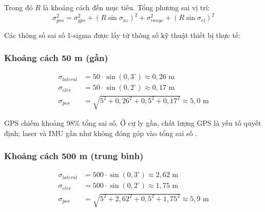 Trong đó $R$ là khoảng cách đến mục tiêu. Tổng phương sai vị trí:
\begin{equation}
    \sigma_{pos}^2 = \sigma_{gps}^2 + \left(R\sin\sigma_{az}\right)^2 + \sigma_{range}^2 + \left(R\sin\sigma_{el}\right)^2
\end{equation}

Các thông số sai số 1-sigma được lấy từ thông số kỹ thuật thiết bị thực tế:

\begin{table}[H]
\centering
\caption{Tham số sai số 1-sigma của từng cảm biến}
\label{tab:sensor-params-w3}
\end{table}

\subsubsection{Khoảng cách 50 m (gần)}
\begin{align*}
\sigma_{lateral} &= 50 \cdot \sin(0{,}3^\circ) \approx 0{,}26 \text{ m} \\
\sigma_{elev} &= 50 \cdot \sin(0{,}2^\circ) \approx 0{,}17 \text{ m} \\
\sigma_{pos} &= \sqrt{5^2 + 0{,}26^2 + 0{,}5^2 + 0{,}17^2} \approx 5{,}0 \text{ m}
\end{align*}

GPS chiếm khoảng 98\% tổng sai số. Ở cự ly gần, chất lượng GPS là yếu tố quyết định; laser và IMU gần như không đóng góp vào tổng sai số \cite{misra2006gps}.

\subsubsection{Khoảng cách 500 m (trung bình)}
\begin{align*}
\sigma_{lateral} &= 500 \cdot \sin(0{,}3^\circ) \approx 2{,}62 \text{ m} \\
\sigma_{elev} &= 500 \cdot \sin(0{,}2^\circ) \approx 1{,}75 \text{ m} \\
\sigma_{pos} &= \sqrt{5^2 + 2{,}62^2 + 0{,}5^2 + 1{,}75^2} \approx 5{,}9 \text{ m}
\end{align*}

